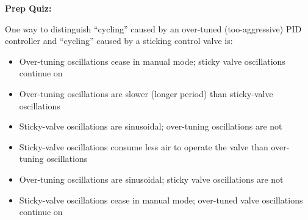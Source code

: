 \vfil \eject

\noindent
{\bf Prep Quiz:}

One way to distinguish ``cycling'' caused by an over-tuned (too-aggressive) PID controller and ``cycling'' caused by a sticking control valve is:

\begin{itemize}
\item{} Over-tuning oscillations cease in manual mode; sticky valve oscillations continue on
\vskip 5pt 
\item{} Over-tuning oscillations are slower (longer period) than sticky-valve oscillations
\vskip 5pt 
\item{} Sticky-valve oscillations are sinusoidal; over-tuning oscillations are not
\vskip 5pt 
\item{} Sticky-valve oscillations consume less air to operate the valve than over-tuning oscillations
\vskip 5pt 
\item{} Over-tuning oscillations are sinusoidal; sticky valve oscillations are not
\vskip 5pt 
\item{} Sticky-valve oscillations cease in manual mode; over-tuned valve oscillations continue on
\end{itemize}





